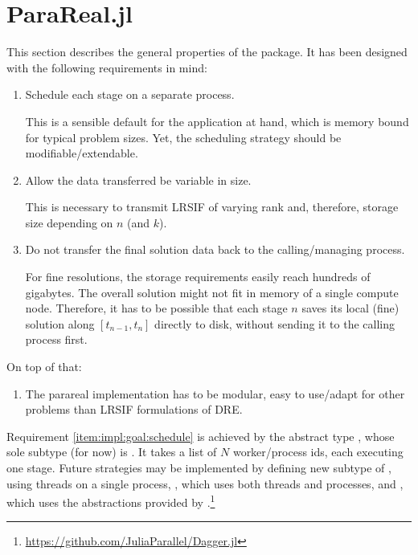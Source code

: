 \section{ParaReal.jl}
\label{sec:impl:pr}

This section describes the general properties of the  package.
It has been designed with the following requirements in mind:
\begin{enumerate}
  \item\label{item:impl:goal:schedule}
    Schedule each stage on a separate process.

    This is a sensible default for the application at hand,
    which is memory bound for typical problem sizes.
    Yet, the scheduling strategy should be modifiable/extendable.
  \item\label{item:impl:goal:variablesize}
    Allow the data transferred be variable in size.

    This is necessary to transmit \ac{LRSIF} of varying rank and, therefore, storage size depending on $n$ (and $k$).
  \item\label{item:impl:goal:notransfer}
    Do not transfer the final solution data back to the calling/managing process.

    For fine resolutions, the storage requirements easily reach hundreds of gigabytes.
    The overall solution might not fit in memory of a single compute node.
    Therefore, it has to be possible that each stage $n$ saves its local (fine) solution along $[t_{n-1},t_n]$ directly to disk,
    without sending it to the calling process first.
\end{enumerate}
On top of that:
\begin{enumerate}[resume]
  \item\label{item:impl:goal:modularity}
    The parareal implementation has to be modular,
    \ie easy to use/adapt for other problems than \ac{LRSIF} formulations of \ac{DRE}.
\end{enumerate}

Requirement \ref{item:impl:goal:schedule} is achieved by the abstract type ,
whose sole subtype (for now) is .
It takes a list of $N$ worker/process ids, each executing one stage.
Future strategies may be implemented by defining new subtype of , \eg
{} using threads on a single process,
, which uses both threads and processes, and
, which uses the abstractions provided by .\footnote{\url{https://github.com/JuliaParallel/Dagger.jl}}

